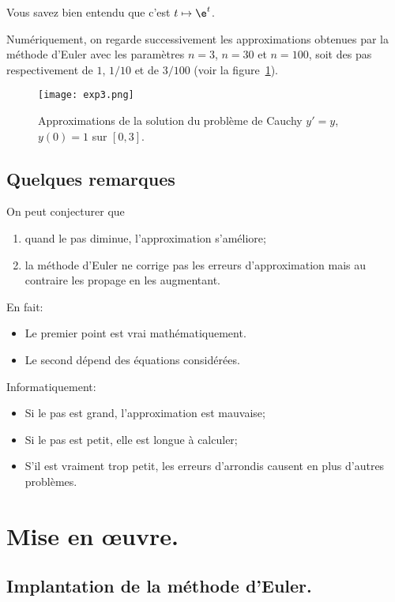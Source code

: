 \begin{rem}
  Vous savez bien entendu que c'est  $t\mapsto \e^{t}$.
\end{rem}

Numériquement, on regarde successivement les approximations obtenues par la méthode d'Euler avec les paramètres $n=3$, $n=30$ et $n=100$, soit des pas respectivement de $1$, $1/10$ et de $3/100$ (voir la figure~\ref{11:fig:exp3}).
\begin{figure}[h!]
\begin{center}
\texttt{[image: exp3.png]}
\caption{Approximations de la solution du problème de Cauchy $y'=y$, $y(0)=1$ sur $[0,3]$.}
\label{11:fig:exp3}
\end{center}
\end{figure}

\subsection{Quelques remarques}
On peut conjecturer que
\begin{enumerate}
\item quand le pas diminue, l'approximation s'améliore;
\item la méthode d'Euler ne corrige pas les erreurs d'approximation
  mais au contraire les propage en les augmentant.
\end{enumerate}

En fait:
\begin{itemize}
\item Le premier point est vrai mathématiquement.
\item Le second dépend des équations considérées.
\end{itemize}

\clearslide{}
Informatiquement:
\begin{itemize}
\item Si le pas est grand, l'approximation est mauvaise;
\item Si le pas est petit, elle est longue à calculer;
\item S'il est vraiment trop petit, les erreurs d'arrondis causent en
  plus d'autres problèmes.
\end{itemize}

\clearslide{}
\section{Mise en œuvre.}

\subsection{Implantation de la méthode d'Euler.}

